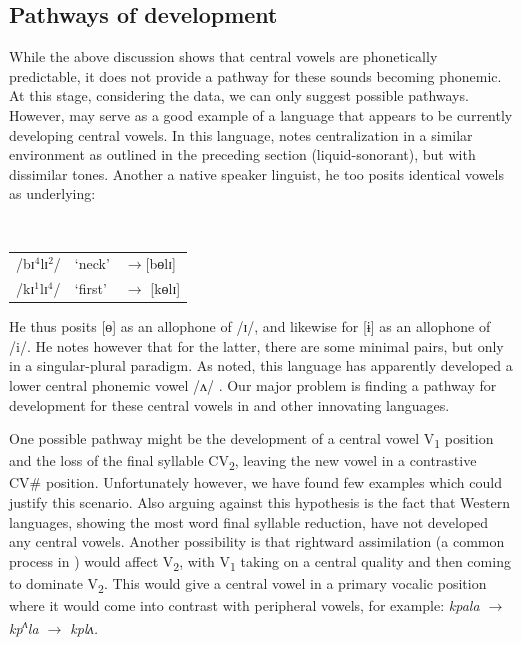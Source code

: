 \documentclass[output=paper,newtxmath,modfonts,nonflat]{langsci/langscibook}
\begin{document}
\subsection{Pathways of development}\label{sec:zogbo:4.2} 

While the above discussion shows that central vowels are phonetically predictable, it does not provide a pathway for these sounds becoming phonemic.  At this stage, considering the data, we can only suggest possible pathways.  However,  may serve as a good example of a language that appears to be currently developing central vowels.  In this language, \citet[191]{Goprou2014} notes centralization in a similar environment as outlined in the preceding section (liquid-sonorant), but with dissimilar tones. Another a native speaker linguist, he too posits identical vowels as underlying:

\ea {}\\
\begin{tabular}{lll}
/bɪ$^4$lɪ$^2$/ & ‘neck’ & $\rightarrow$[bɵlɪ]\\
/kɪ$^1$lɪ$^4$/ & ‘first’ & $\rightarrow$ [kɵlɪ]\\
\end{tabular}
\z

He thus posits [ɵ] as an allophone of /ɪ/, and likewise for [ɨ] as an allophone of /i/.  He notes however that for the latter, there are some minimal pairs, but only in a singular-plural paradigm. As noted, this language has apparently developed a lower central phonemic vowel /ʌ/ \citep{Vahoua2011}. Our major problem is finding a pathway for development for these central vowels in  and other innovating languages. 

One possible pathway might be the development of a central vowel V\textsubscript{1} position and the loss of the final syllable CV\textsubscript{2}, leaving the new vowel in a contrastive CV\# position.  Unfortunately however, we have found few examples which could justify this scenario. Also arguing against this hypothesis is the fact that Western languages, showing the most word final syllable reduction, have not developed any central vowels.  Another possibility is that rightward assimilation (a common  process in ) would affect V\textsubscript{2}, with V\textsubscript{1} taking on a central quality and then coming to dominate V\textsubscript{2}. This would give a central vowel in a primary vocalic position where it would come into contrast with peripheral vowels, for example:  \textit{kpala $\rightarrow$  kp\textsuperscript{ʌ}}\textit{la $\rightarrow$ kplʌ.}
\end{document}
